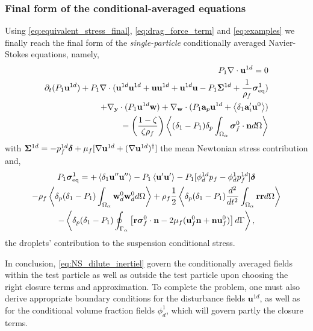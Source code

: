 \subsubsection{Final form of the conditional-averaged equations}

Using  \ref{eq:equivalent_stress_final}, \ref{eq:drag_force_term} and \ref{eq:examples} we finally reach the final form of the \textit{single-particle}  conditionally averaged Navier-Stokes equations, namely, 
\begin{align}
    P_1 \div \textbf{u}^{1d} = 0 \\
    \pddt (P_1 \textbf{u}^{1d})
    + P_1 \div (
     \textbf{u}^{1d} \textbf{u}^{1d}  
    + \textbf{u} \textbf{u}^{1d} 
    + \textbf{u}^{1d} \textbf{u} 
    - P_1 \bm\Sigma^{1d}
    + \frac{1}{\rho_f}\bm\sigma^1_\text{eq})\nonumber\\
    + \pddy\cdot (P_1 \textbf{u}^{1d} \textbf{w}) 
    + \pddw\cdot(P_1 \textbf{a}_p \textbf{u}^{1d} + \avg{\delta_1 \textbf{a}_i' \textbf{u}^0} )\\
    = \left(\frac{1-\zeta}{\zeta\rho_f}\right) \avg{ (\delta_1 - P_1) \delta_p \intO{\bm\sigma_f^0\cdot \textbf{n}}}
    \label{eq:NS_dilute_inertiel}
\end{align}
with $\bm\Sigma^{1d} = -p_f^{1d} \bm\delta + \mu_f [\mathbf{\nabla} \textbf{u}^{1d}+(\mathbf{\nabla} \textbf{u}^{1d})^\dagger]$ the mean Newtonian stress contribution and, 
\begin{multline*}
    P_1\bm\sigma^1_\text{eq}
    = + \left<\delta_1 \textbf{u}''\textbf{u}''\right>
    - P_1 \left< \textbf{u}'\textbf{u}'\right>
    - P_1 [\phi_d^{1d} p_f
    - \phi_d^1 p_f^{1d}]\bm\delta \\
    - \rho_f \left<\delta_p (\delta_1 - P_1) \int_{\Omega_{\alpha}} \textbf{w}_d^0\textbf{w}_d^0  d\Omega\right>
    + \rho_f \frac{1}{2}\left<\delta_p (\delta_1 - P_1)\frac{d^2}{dt^2} \int_{\Omega_{\alpha}} \textbf{rr} d\Omega \right> \\
    - \left<\delta_p (\delta_1 - P_1) \oint_{\Gamma_{\alpha}} \left[
        \textbf{r}\bm{\sigma}_f^0 \cdot \textbf{n}
        -  2 \mu_f (\textbf{u}_f^0 \textbf{n} + \textbf{n} \textbf{u}_f^0)
        \right] 
     d\Gamma\right>,
\end{multline*}
the droplets' contribution to the suspension conditional stress. 

In conclusion, \ref{eq:NS_dilute_inertiel} govern the conditionally averaged fields within the test particle as well as outside the test particle upon choosing the right closure terms and approximation. 
To complete the problem, one must also derive appropriate boundary conditions for the disturbance fields $\textbf{u}^{1d}$, as well as for the conditional volume fraction fields $\phi_d^1$, which will govern partly the closure terms. 

